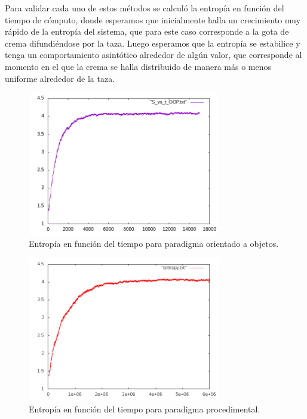 \documentclass[12pt,twocolumn]{article}
\begin{document}
Para validar cada uno de estos métodos se calculó la entropía en función del tiempo de 
cómputo, donde esperamos que inicialmente halla un crecimiento muy rápido de la entropía del 
sistema, que para este caso corresponde a la gota de crema difundiéndose por la taza. Luego 
esperamos que la entropía se estabilice y tenga un comportamiento asintótico alrededor de 
algún valor, que corresponde al momento en el que la crema se halla distribuido de manera 
más o menos uniforme alrededor de la taza.
\\
\begin{figure}
    \centering
    \includegraphics[width=0.75\textwidth]{figs/S_vs_t_OOP.png}
    \caption{Entropía en función del tiempo para paradigma orientado a objetos.}
    \label{fig:s_vs_t_OOP}
\end{figure}
\begin{figure}
    \centering
    \includegraphics[width=0.75\textwidth]{figs/entropy.png}
    \caption{Entropía en función del tiempo para paradigma procedimental.}
    \label{fig:s_vs_t_Proc}
\end{figure}
\end{document}
